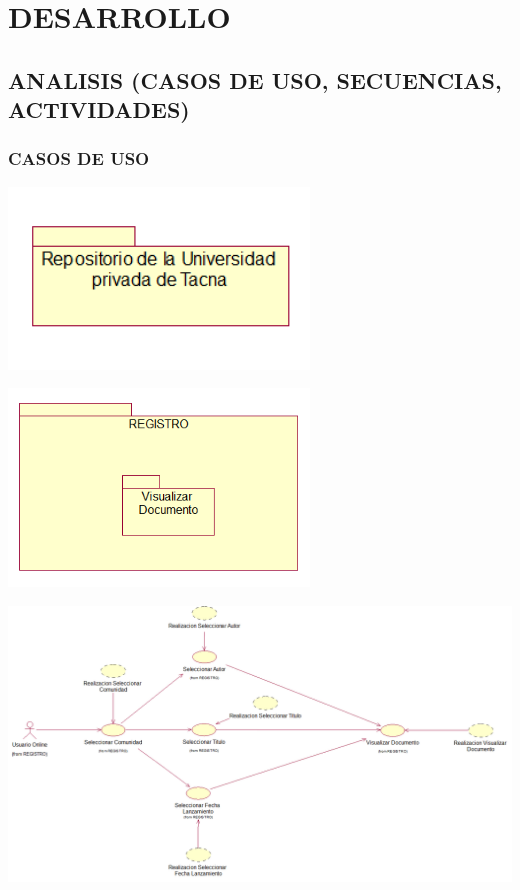 \section{DESARROLLO} 
\subsection{ANALISIS (CASOS DE USO, SECUENCIAS, ACTIVIDADES)}
\subsubsection{CASOS DE USO}
\thinspace
\thinspace
\thinspace
\thinspace
\thinspace
\thinspace
\thinspace
\thinspace
\thinspace
\thinspace
\thinspace
\thinspace
\thinspace
\thinspace
\thinspace
\thinspace
\begin{center}
\includegraphics[width=8cm]{./Imagenes/CasoUso1}
\end{center}
\thinspace
\thinspace
\thinspace
\thinspace
\thinspace
\thinspace
\thinspace
\thinspace
\thinspace
\thinspace
\thinspace
\thinspace
\thinspace
\thinspace
\thinspace
\thinspace
\thinspace
\begin{center}
\includegraphics[width=8cm]{./Imagenes/CasoUso2}
\end{center}	
\thinspace
\thinspace
\thinspace
\thinspace
\thinspace
\thinspace
\thinspace
\thinspace
\thinspace
\thinspace
\thinspace
\thinspace
\thinspace
\thinspace
\thinspace
\thinspace
\thinspace
\thinspace
\thinspace
\thinspace
\thinspace
\thinspace
\thinspace
\thinspace
\thinspace
\thinspace
\begin{center}
\includegraphics[width=18cm]{./Imagenes/CasoUso3}
\end{center}